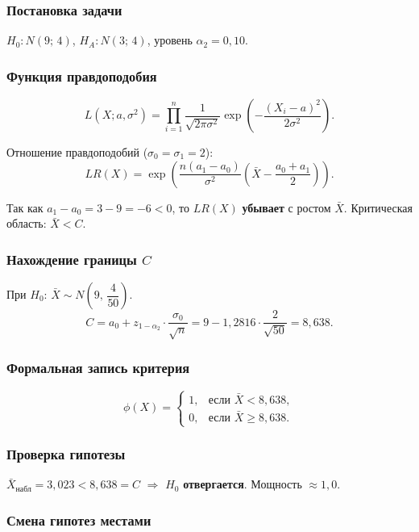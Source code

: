 \documentclass[12pt,a4paper]{article}
\begin{document}
	\subsubsection*{Постановка задачи}
	
	$H_0\colon N(9;\,4)$,\; $H_A\colon N(3;\,4)$, уровень $\alpha_2=0{,}10$.
	
	\subsubsection*{Функция правдоподобия}
	
	\[
	L(X;a,\sigma^2) = \prod_{i=1}^n \frac{1}{\sqrt{2\pi\sigma^2}}
	\exp\!\left(-\frac{(X_i-a)^2}{2\sigma^2}\right).
	\]
	
	Отношение правдоподобий ($\sigma_0=\sigma_1=2$):
	\[
	LR(X) = \exp\!\left(\frac{n(a_1-a_0)}{\sigma^2}\left(\bar{X}-\frac{a_0+a_1}{2}\right)\right).
	\]
	
	Так как $a_1-a_0 = 3-9 = -6 < 0$, то $LR(X)$ \textbf{убывает} с ростом $\bar{X}$.
	Критическая область: $\bar{X} < C$.
	
	\subsubsection*{Нахождение границы $C$}
	
	При $H_0$: $\bar{X}\sim N\!\left(9,\, \dfrac{4}{50}\right)$.
	\[
	C = a_0 + z_{1-\alpha_2}\cdot\frac{\sigma_0}{\sqrt{n}}
	= 9 - 1{,}2816\cdot\frac{2}{\sqrt{50}} = 8{,}638.
	\]
	
	\subsubsection*{Формальная запись критерия}
	
	\[
	\phi(X) = \begin{cases}
		1, & \text{если } \bar{X} < 8{,}638,\\
		0, & \text{если } \bar{X} \ge 8{,}638.
	\end{cases}
	\]
	
	\subsubsection*{Проверка гипотезы}
	
	$\bar{X}_{\text{набл}} = 3{,}023 < 8{,}638 = C$ $\Rightarrow$ $H_0$ \textbf{отвергается}.
	Мощность $\approx 1{,}0$.
	
	\subsubsection*{Смена гипотез местами}
	
\end{document}
